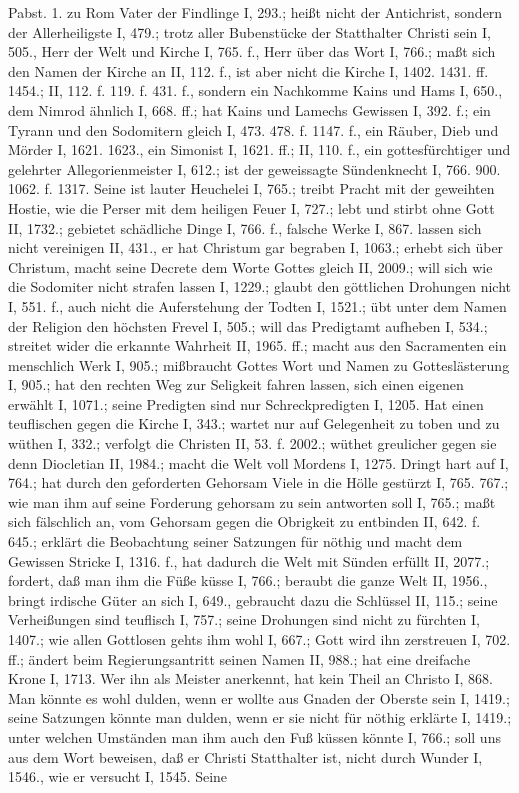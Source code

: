 Pabst. 1.  zu Rom Vater der Findlinge I, 293.; heißt nicht der Antichrist, sondern der Allerheiligste I, 479.;  trotz aller Bubenstücke der Statthalter Christi sein I, 505., Herr der Welt und Kirche I, 765. f., Herr über das Wort I, 766.; maßt sich den Namen der Kirche an II, 112. f., ist aber nicht
die Kirche I, 1402. 1431. ff. 1454.; II, 112. f. 119. f. 431. f., sondern ein Nachkomme Kains und Hams I, 650., dem Nimrod ähnlich I, 668. ff.; hat Kains und Lamechs Gewissen I, 392. f.; ein Tyrann und den Sodomitern gleich I, 473. 478. f. 1147. f., ein Räuber, Dieb und Mörder I, 1621. 1623., ein Simonist I, 1621. ff.; II, 110. f., ein gottesfürchtiger und gelehrter Allegorienmeister I, 612.; ist der geweissagte Sündenknecht I, 766. 900. 1062. f. 1317. Seine  ist lauter Heuchelei I, 765.; treibt Pracht mit der geweihten Hostie, wie die Perser mit dem heiligen Feuer I, 727.; lebt und stirbt ohne Gott II, 1732.; gebietet schädliche Dinge I, 766. f., falsche Werke I, 867.  lassen sich nicht vereinigen II, 431., er hat Christum gar begraben I, 1063.; erhebt sich über Christum, macht seine Decrete dem Worte Gottes gleich II, 2009.; will sich wie die Sodomiter nicht strafen lassen I, 1229.; glaubt den göttlichen Drohungen nicht I, 551. f., auch nicht die Auferstehung der Todten I, 1521.; übt unter dem Namen der Religion den höchsten Frevel I, 505.; will das Predigtamt aufheben I, 534.; streitet wider die erkannte Wahrheit II, 1965. ff.; macht aus den Sacramenten ein menschlich Werk I, 905.; mißbraucht Gottes Wort und Namen zu Gotteslästerung I, 905.; hat den rechten Weg zur Seligkeit fahren lassen, sich einen eigenen erwählt I, 1071.; seine Predigten sind nur Schreckpredigten I, 1205. Hat einen teuflischen  gegen die Kirche I, 343.; wartet nur auf Gelegenheit zu toben und zu wüthen I, 332.; verfolgt die Christen II, 53. f. 2002.; wüthet greulicher gegen sie denn Diocletian II, 1984.; macht die Welt voll Mordens I, 1275. Dringt hart auf  I, 764.; hat durch den geforderten Gehorsam Viele in die Hölle gestürzt I, 765. 767.; wie man ihm auf seine Forderung gehorsam zu sein antworten soll I, 765.; maßt sich fälschlich an, vom Gehorsam gegen die Obrigkeit zu entbinden II, 642. f. 645.; erklärt die Beobachtung seiner Satzungen für nöthig und macht dem Gewissen Stricke I, 1316. f., hat dadurch die Welt mit Sünden erfüllt II, 2077.; fordert, daß man ihm die Füße küsse I, 766.; beraubt die ganze Welt II, 1956., bringt irdische Güter an sich I, 649., gebraucht dazu die Schlüssel II, 115.; seine Verheißungen sind teuflisch I, 757.; seine Drohungen sind nicht zu fürchten I, 1407.; wie allen Gottlosen gehts ihm wohl I, 667.; Gott wird ihn zerstreuen I, 702. ff.; ändert beim Regierungsantritt seinen Namen II, 988.; hat eine dreifache Krone I, 1713. Wer ihn als Meister anerkennt, hat kein Theil an Christo I, 868. Man könnte es wohl dulden, wenn er wollte aus Gnaden der Oberste sein I, 1419.; seine Satzungen könnte man dulden, wenn er sie nicht für nöthig erklärte I, 1419.; unter welchen Umständen man ihm auch den Fuß küssen könnte I, 766.; soll uns aus dem Wort beweisen, daß er Christi Statthalter ist, nicht durch Wunder I, 1546., wie er versucht I, 1545. Seine 